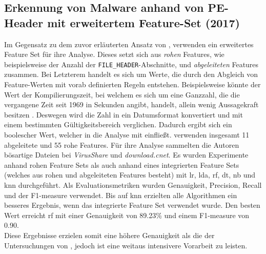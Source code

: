 \documentclass[
    12pt, %
    DIV10,
    ngerman, %
    a4paper, %
    oneside, %
    titlepage, %
    parskip=half, %
    headings=normal, %
    listof=totoc, %
    bibliography=totoc, %
    index=totoc, %
    captions=tableheading, %
    final %
]{scrreprt}
\begin{document}
\subsection{Erkennung von Malware anhand von PE-Header mit erweitertem  Feature-Set (2017)}
Im Gegensatz zu dem zuvor erläuterten Ansatz  von \textcite{Raff2017}, verwenden \textcite{Kumar2017} ein erweitertes Feature Set für ihre Analyse. Dieses setzt sich aus \emph{rohen} Features, wie beispielsweise der Anzahl der \texttt{FILE\_HEADER}-Abschnitte, und \emph{abgeleiteten} Features zusammen. Bei Letzterem handelt es sich um Werte, die durch den Abgleich von Feature-Werten mit vorab definierten Regeln entstehen. Beispielsweise könnte der Wert der Kompilierungszeit, bei welchem es sich um eine Ganzzahl, die die vergangene Zeit seit 1969 in Sekunden angibt, handelt, allein wenig Aussagekraft besitzen \parencite{Kumar2017}. Deswegen wird die Zahl in ein Datumsformat konvertiert und mit einem bestimmten Gültigkeitsbereich verglichen. Dadurch ergibt sich ein boolescher Wert, welcher in die Analyse mit einfließt. \textcite{Kumar2017} verwenden insgesamt 11 abgeleitete und 55 rohe Features. Für ihre Analyse sammelten die Autoren bösartige Dateien bei \emph{VirusShare} und \emph{download.cnet}. Es wurden Experimente anhand  rohen Feature Sets als auch anhand eines integrierten Feature Sets (welches aus rohen und abgeleiteten Features besteht) mit \ac{lr}, \ac{lda}, \ac{rf}, \ac{dt}, \ac{nb} und \ac{knn} durchgeführt. Als Evaluationsmetriken wurden Genauigkeit, Precision, Recall und der F1-measure verwendet. Bis auf \ac{knn} erzielten alle Algorithmen ein besseres Ergebnis, wenn das integrierte Feature Set verwendet wurde. Den besten Wert erreicht \ac{rf} mit einer Genauigkeit von 89.23\% und einem F1-measure von 0.90. \\
Diese Ergebnisse erzielen somit eine höhere Genauigkeit als die der Untersuchungen von \textcite{Raff2017}, jedoch ist eine weitaus intensivere Vorarbeit zu leisten.
%
\end{document}
